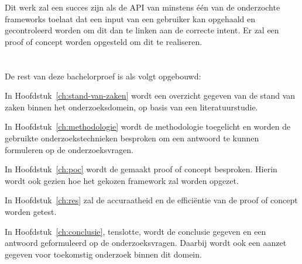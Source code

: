 Dit werk zal een succes zijn als de API van minstens één van de onderzochte frameworks toelaat dat een input van een gebruiker kan opgehaald en gecontroleerd worden om dit dan te linken aan de correcte intent. Er zal een proof of concept worden opgesteld om dit te realiseren.

\section{}
\label{sec:opzet-bachelorproef}


De rest van deze bachelorproef is als volgt opgebouwd:

In Hoofdstuk~\ref{ch:stand-van-zaken} wordt een overzicht gegeven van de stand van zaken binnen het onderzoeksdomein, op basis van een literatuurstudie.

In Hoofdstuk~\ref{ch:methodologie} wordt de methodologie toegelicht en worden de gebruikte onderzoekstechnieken besproken om een antwoord te kunnen formuleren op de onderzoeksvragen.


In Hoofdstuk~\ref{ch:poc} wordt de gemaakt proof of concept besproken. Hierin wordt ook gezien hoe het gekozen framework zal worden opgezet.

In Hoofdstuk~\ref{ch:res} zal de accuraatheid en de efficiëntie van de proof of concept worden getest.

In Hoofdstuk~\ref{ch:conclusie}, tenslotte, wordt de conclusie gegeven en een antwoord geformuleerd op de onderzoeksvragen. Daarbij wordt ook een aanzet gegeven voor toekomstig onderzoek binnen dit domein.